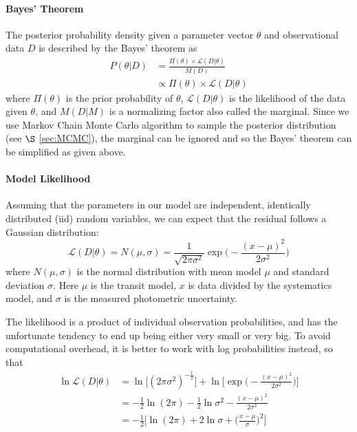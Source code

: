 \paragraph{Bayes' Theorem}
The posterior probability density given a parameter vector $\theta$ and observational data $D$ is described by the Bayes' theorem as
\begin{align}
P(\theta|D)&=\frac{\Pi(\theta) \times \mathcal{L}(D|\theta)}{M(D)} \\
& \propto \Pi(\theta) \times \mathcal{L}(D|\theta)
\end{align}
where $\Pi(\theta)$ is the prior probability of $\theta$, $\mathcal{L}(D|\theta)$ is the likelihood of the data given $\theta$, and $M(D|M)$ is a normalizing factor also called the marginal. Since we use Markov Chain Monte Carlo algorithm to sample the posterior distribution (see $\S$ \ref{sec:MCMC}), the marginal can be ignored and so the Bayes' theorem can be simplified as given above.

\paragraph{Model Likelihood}%
Assuming that the parameters in our model are independent, identically distributed (iid) random variables, we can expect that the residual follows a Gaussian distribution:
\begin{equation}
\label{eq:likelihood}
\mathcal{L}(D|\theta) = N(\mu,\sigma) = \frac{1}{\sqrt{2\pi \sigma^2}} \exp \Big(-\frac{(x-\mu)^2}{2\sigma^2} \Big)
\end{equation}
where $N(\mu,\sigma)$ is the normal distribution with mean model $\mu$ and standard deviation $\sigma$. Here $\mu$ is the transit model, $x$ is data divided by the systematics model, and $\sigma$ is the measured photometric uncertainty.

The likelihood is a product of individual observation probabilities, and has the unfortunate tendency to end up being either very small or very big. To avoid computational overhead, it is better to work with log probabilities instead, so that
\begin{align}
\ln \mathcal{L}(D|\theta)& = \ln\Big[(2\pi\sigma^2)^{-\frac{1}{2}}\Big] +\ln \Big[\exp\Big(-\frac{(x-\mu)^2}{2\sigma^2}\Big)\Big] \\
& = -\frac{1}{2}\ln(2\pi) -\frac{1}{2}\ln \sigma^2 -\frac{(x-\mu)^2}{2\sigma^2} \\
&= -\frac{1}{2}\Big[\ln(2\pi) +2\ln\sigma +\Big(\frac{x-\mu}{\sigma}\Big)^2\Big]
\label{eq:loglikelihood}
\end{align}

